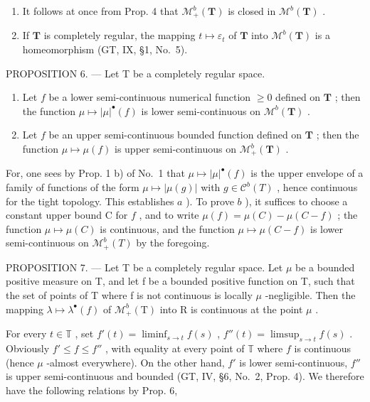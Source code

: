 \begin{enumerate}
\def\labelenumi{\arabic{enumi})}
\setcounter{enumi}{1}
\item
  It follows at once from Prop. 4 that \(\mathcal{M}_+^b (\mathbf{T})\) is closed in \(\mathcal{M}^b (\mathbf{T})\) .
\item
  If \(\mathbf{T}\) is completely regular, the mapping \(t \mapsto \varepsilon_t\) of \(\mathbf{T}\) into \(\mathcal{M}^b(\mathbf{T})\) is a homeomorphism (GT, IX, §1, No.~5).
\end{enumerate}

PROPOSITION 6. --- Let T be a completely regular space.

\begin{enumerate}
\def\labelenumi{\alph{enumi})}
\item
  Let \(f\) be a lower semi-continuous numerical function \(\geqslant 0\) defined on \(\mathbf{T}\) ; then the function \(\mu \mapsto |\mu|^{\bullet}(f)\) is lower semi-continuous on \(\mathcal{M}^b(\mathbf{T})\) .
\item
  Let \(f\) be an upper semi-continuous bounded function defined on \(\mathbf{T}\) ; then the function \(\mu \mapsto \mu(f)\) is upper semi-continuous on \(\mathcal{M}_+^b(\mathbf{T})\) .
\end{enumerate}

For, one sees by Prop. 1 b) of No.~1 that \(\mu \mapsto |\mu|^{\bullet}(f)\) is the upper envelope of a family of functions of the form \(\mu \mapsto |\mu(g)|\) with \(g \in \mathcal{C}^b(T)\) , hence continuous for the tight topology. This establishes \(a\) ). To prove \(b\) ), it suffices to choose a constant upper bound C for \(f\) , and to write \(\mu(f) = \mu(C) - \mu(C - f)\) ; the function \(\mu \mapsto \mu(C)\) is continuous, and the function \(\mu \mapsto \mu(C - f)\) is lower semi-continuous on \(\mathcal{M}_+^b(T)\) by the foregoing.

PROPOSITION 7. --- Let T be a completely regular space. Let \(\mu\) be a bounded positive measure on T, and let f be a bounded positive function on T, such that the set of points of T where f is not continuous is locally \(\mu\) -negligible. Then the mapping \(\lambda \mapsto \lambda^{\bullet}(f)\) of \(\mathcal{M}_{+}^{b}(\mathrm{T})\) into R is continuous at the point \(\mu\) .

For every \(t \in \mathbb{T}\) , set \(f'(t) = \liminf_{s \to t} f(s)\) , \(f''(t) = \limsup_{s \to t} f(s)\) . Obviously \(f' \leqslant f \leqslant f''\) , with equality at every point of \(\mathbb{T}\) where \(f\) is continuous (hence \(\mu\) -almost everywhere). On the other hand, \(f'\) is lower semi-continuous, \(f''\) is upper semi-continuous and bounded (GT, IV, §6, No.~2, Prop. 4). We therefore have the following relations by Prop. 6,

